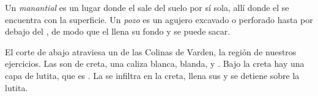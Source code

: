 \begin{definition}\label{def:g6:water-underground:spring}
Un \emph{manantial} es un lugar donde el 
sale del suelo por sí sola, allí donde el  se encuentra con
la superficie. Un \emph{pozo} es un agujero excavado o perforado
hasta por debajo del , de modo que el  llena
su fondo y se puede sacar.
\end{definition}

El corte de abajo atraviesa un  de las Colinas de Varden, la región de
nuestros ejercicios. Las  son de creta, una caliza blanca, blanda,
 y . Bajo la creta hay una capa de lutita, que es
. La  se infiltra en la creta, llena sus  y se
detiene sobre la lutita.

